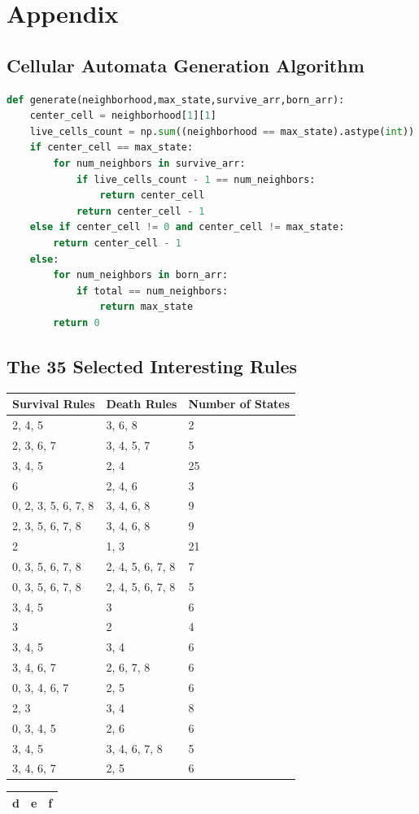 \documentclass[12pt]{article}
\numberwithin{figure}{section} %
\begin{document}
\newpage
\section{Appendix}
\subsection{Cellular Automata Generation Algorithm}
\begin{lstlisting}[language=Python]
def generate(neighborhood,max_state,survive_arr,born_arr):
    center_cell = neighborhood[1][1]
    live_cells_count = np.sum((neighborhood == max_state).astype(int))
    if center_cell == max_state: 
        for num_neighbors in survive_arr:
            if live_cells_count - 1 == num_neighbors: 
                return center_cell 
            return center_cell - 1
    else if center_cell != 0 and center_cell != max_state:
        return center_cell - 1
    else:
        for num_neighbors in born_arr: 
            if total == num_neighbors:
                return max_state 
        return 0
\end{lstlisting}

\subsection{The 35 Selected Interesting Rules}
\begin{tabular}{ | m{2cm} | m{2cm} | m{2cm}|} 
\hline
Survival Rules & Death Rules & Number of States\\
\hline 
2, 4, 5 & 3, 6, 8 & 2\\
\hline
2, 3, 6, 7 & 3, 4, 5, 7	& 5 \\
\hline
3, 4, 5 & 2, 4 & 25 \\ 
\hline
6 & 2, 4, 6 & 3 \\
\hline
0, 2, 3, 5, 6, 7, 8 & 3, 4, 6, 8 & 9 \\
\hline
2, 3, 5, 6, 7, 8 & 3, 4, 6, 8 & 9 \\
\hline
2 & 1, 3 & 21 \\ 
\hline
0, 3, 5, 6, 7, 8 & 2, 4, 5, 6, 7, 8 & 7 \\
\hline
0, 3, 5, 6, 7, 8 & 2, 4, 5, 6, 7, 8 & 5 \\ 
\hline
3, 4, 5 & 3 & 6 \\
\hline
3 & 2 & 4 \\
\hline
3, 4, 5& 3, 4 & 6 \\
\hline
3, 4, 6, 7 & 2, 6, 7, 8 & 6 \\
\hline
0, 3, 4, 6, 7 & 2, 5 & 6 \\
\hline
2, 3 & 3, 4 & 8 \\
\hline
0, 3, 4, 5 & 2, 6 &6 \\
\hline
3, 4, 5 & 3, 4, 6, 7, 8 & 5 \\
\hline
3, 4, 6, 7 & 2, 5 & 6 \\
\hline 
\end{tabular}
\quad
\begin{tabular}{ccc}
\hline
d&e&f\\
\hline
\end{tabular}
\end{document}
